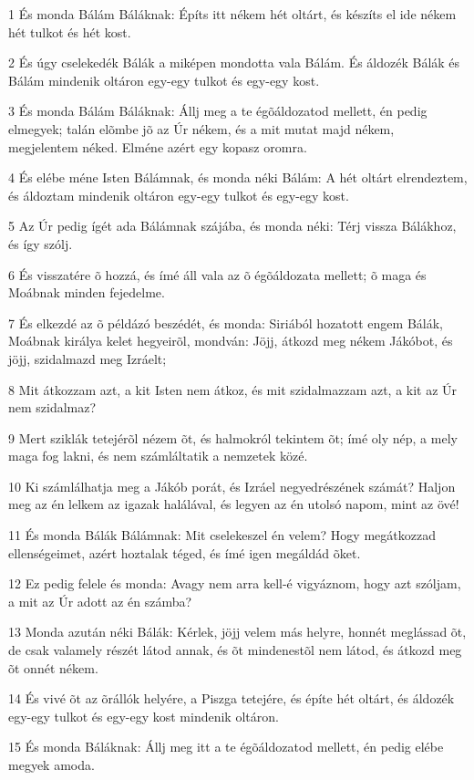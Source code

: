 \par 1 És monda Bálám Báláknak: Építs itt nékem hét oltárt, és készíts el ide nékem hét tulkot és hét kost.
\par 2 És úgy cselekedék Bálák a miképen mondotta vala Bálám. És áldozék Bálák és Bálám mindenik oltáron egy-egy tulkot és egy-egy kost.
\par 3 És monda Bálám Báláknak: Állj meg a te égõáldozatod mellett, én pedig elmegyek; talán elõmbe jõ az Úr nékem, és a mit mutat majd nékem, megjelentem néked. Elméne azért egy kopasz oromra.
\par 4 És elébe méne Isten Bálámnak, és monda néki Bálám: A hét oltárt elrendeztem, és áldoztam mindenik oltáron egy-egy tulkot és egy-egy kost.
\par 5 Az Úr pedig ígét ada Bálámnak szájába, és monda néki: Térj vissza Bálákhoz, és így szólj.
\par 6 És visszatére õ hozzá, és ímé áll vala az õ égõáldozata mellett; õ maga és Moábnak minden fejedelme.
\par 7 És elkezdé az õ példázó beszédét, és monda: Siriából hozatott engem Bálák, Moábnak királya kelet hegyeirõl, mondván: Jöjj, átkozd meg nékem Jákóbot, és jöjj, szidalmazd meg Izráelt;
\par 8 Mit átkozzam azt, a kit Isten nem átkoz, és mit szidalmazzam azt, a kit az Úr nem szidalmaz?
\par 9 Mert sziklák tetejérõl nézem õt, és halmokról tekintem õt; ímé oly nép, a mely maga fog lakni, és nem számláltatik a nemzetek közé.
\par 10 Ki számlálhatja meg a Jákób porát, és Izráel negyedrészének számát? Haljon meg az én lelkem az igazak halálával, és legyen az én utolsó napom, mint az övé!
\par 11 És monda Bálák Bálámnak: Mit cselekeszel én velem? Hogy megátkozzad ellenségeimet, azért hoztalak téged, és ímé igen megáldád õket.
\par 12 Ez pedig felele és monda: Avagy nem arra kell-é vigyáznom, hogy azt szóljam, a mit az Úr adott az én számba?
\par 13 Monda azután néki Bálák: Kérlek, jöjj velem más helyre, honnét meglássad õt, de csak valamely részét látod annak, és õt mindenestõl nem látod, és átkozd meg õt onnét nékem.
\par 14 És vivé õt az õrállók helyére, a Piszga tetejére, és építe hét oltárt, és áldozék egy-egy tulkot és egy-egy kost mindenik oltáron.
\par 15 És monda Báláknak: Állj meg itt a te égõáldozatod mellett, én pedig elébe megyek amoda.
